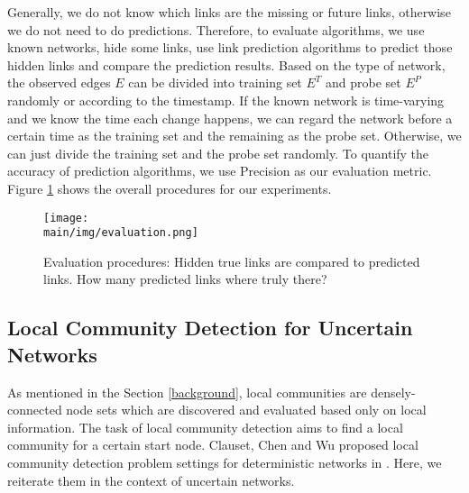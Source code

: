 \documentclass[\main/thesis.tex]{subfiles}
\begin{document}
Generally, we do not know which links are the missing or future links, otherwise we do not need to do predictions. Therefore, to evaluate algorithms, we use known networks, hide some links, use link prediction algorithms to predict those hidden links and compare the prediction results. Based on the type of network, the observed edges $E$ can be divided into training set $E^T$ and probe set $E^P$ randomly or according to the timestamp. If the known network is time-varying and we know the time each change happens, we can regard the network before a certain time as the training set and the remaining as the probe set. Otherwise, we can just divide the training set and the probe set randomly. To quantify the accuracy of prediction algorithms, we use Precision as our evaluation metric. Figure \ref{link-Evaluation-procedures} shows the overall procedures for our experiments. 
\begin{figure}
\centering
\texttt{[image: \\main/img/evaluation.png]}
\caption{Evaluation procedures: Hidden true links are compared to predicted links. How many predicted links where truly there?}
\label{link-Evaluation-procedures}
\end{figure}


\subsection{Local Community Detection for Uncertain Networks}
As mentioned in the Section \ref{background}, local communities are densely-connected node sets which are discovered and evaluated based only on local information. The task of local community detection aims to find a local community for a certain start node. Clauset, Chen and Wu proposed local community detection problem settings for deterministic networks in \cite{clauset2005finding,chen2009detecting,wu2012local}. Here, we reiterate them in the context of uncertain networks.
\end{document}

